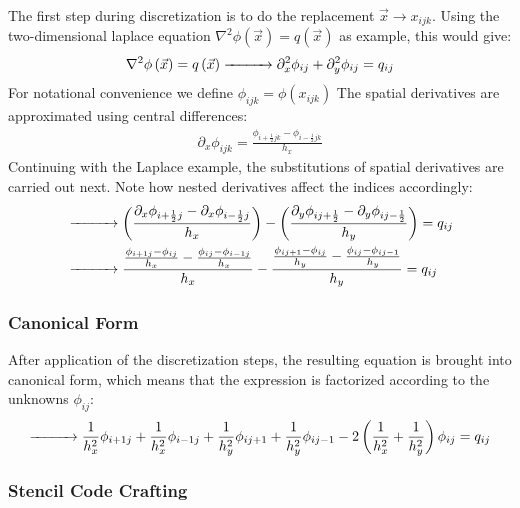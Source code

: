 The first step during discretization is to do the replacement $\vec{x}\rightarrow x_{ijk}$. Using the two-dimensional laplace equation $\nabla^2\phi(\vec{x})=q(\vec{x})$ as example, this would give:
\begin{align*}
\nabla^2\phi\left(\vec{x}\right)=q\left(\vec{x}\right)
\xrightarrow{\makebox[1cm]{}}
\partial_x^2\phi_{ij}+
\partial_y^2\phi_{ij}
=
q_{ij}
\end{align*}
For notational convenience we define $\phi_{ijk} = \phi\left(x_{ijk}\right)$ The spatial derivatives are approximated using central differences:
\begin{align}
\partial_x\phi_{ijk} = \frac{\phi_{i+\frac{1}{2}jk} - \phi_{i-\frac{1}{2}jk}}{h_x}
\label{eq:pn_solver_central_difference}
\end{align}
Continuing with the Laplace example, the substitutions of spatial derivatives are carried out next. Note how nested derivatives affect the indices accordingly:
\begin{align*}
&
\xrightarrow{\makebox[1cm]{}}
\left(
\frac
{
\partial_x
\phi_{i+\frac{1}{2}j}
-
\partial_x
\phi_{i-\frac{1}{2}j}
}
{h_x}
\right)
-
\left(
\frac
{
\partial_y
\phi_{ij+\frac{1}{2}}
-
\partial_y
\phi_{ij-\frac{1}{2}}
}
{h_y}
\right)
=
q_{ij}
\\
&
\xrightarrow{\makebox[1cm]{}}
\frac
{
\frac{\phi_{i+1j} - \phi_{ij}}{h_x}
-
\frac{\phi_{ij} - \phi_{i-1j}}{h_x}
}
{h_x}
-
\frac
{
\frac{\phi_{ij+1} - \phi_{ij}}{h_y}
-
\frac{\phi_{ij} - \phi_{ij-1}}{h_y}
}
{h_y}
=
q_{ij}
\end{align*}

\subsubsection*{Canonical Form}
After application of the discretization steps, the resulting equation is brought into canonical form, which means that the expression is factorized according to the unknowns $\phi_{ij}$:
\begin{align}
\xrightarrow{\makebox[1cm]{}}
\frac{1}{h_x^2}\phi_{i+1j}
+\frac{1}{h_x^2}\phi_{i-1j}
+\frac{1}{h_y^2}\phi_{ij+1}
+\frac{1}{h_y^2}\phi_{ij-1}
-2\left(\frac{1}{h_x^2}+\frac{1}{h_y^2}\right)\phi_{ij}
=
q_{ij}
\label{eq:pn_laplace_canonical_form}
\end{align}

\subsubsection*{Stencil Code Crafting}

